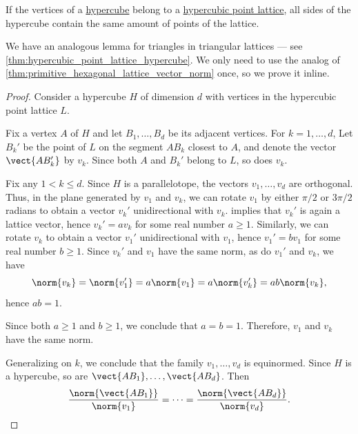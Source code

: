 \begin{lemma}\label{thm:hypercubic_point_lattice_hypercube}
  If the vertices of a \hyperref[def:hypercube]{hypercube} belong to a \hyperref[def:hypercubic_point_lattice]{hypercubic point lattice}, all sides of the hypercube contain the same amount of points of the lattice.
\end{lemma}
\begin{comments}
  \item We have an analogous lemma for triangles in triangular lattices --- see \cref{thm:hypercubic_point_lattice_hypercube}. We only need to use the analog of \cref{thm:primitive_hexagonal_lattice_vector_norm} once, so we prove it inline.
\end{comments}
\begin{proof}
  Consider a hypercube \( H \) of dimension \( d \) with vertices in the hypercubic point lattice \( L \).

  Fix a vertex \( A \) of \( H \) and let \( B_1, \ldots, B_d \) be its adjacent vertices. For \( k = 1, \ldots, d \), Let \( B_k' \) be the point of \( L \) on the segment \( A B_k \) closest to \( A \), and denote the vector \( \vect{A B_k'} \) by \( v_k \). Since both \( A \) and \( B_k' \) belong to \( L \), so does \( v_k \).

  Fix any \( 1 < k \leq d \). Since \( H \) is a parallelotope, the vectors \( v_1, \ldots, v_d \) are orthogonal. Thus, in the plane generated by \( v_1 \) and \( v_k \), we can rotate \( v_1 \) by either \( \pi / 2 \) or \( 3\pi / 2 \) radians to obtain a vector \( v_k' \) unidirectional with \( v_k \).  implies that \( v_k' \) is again a lattice vector, hence \( v_k' = a v_k \) for some real number \( a \geq 1 \). Similarly, we can rotate \( v_k \) to obtain a vector \( v_1' \) unidirectional with \( v_1 \), hence \( v_1' = b v_1 \) for some real number \( b \geq 1 \). Since \( v_k' \) and \( v_1 \) have the same norm, as do \( v_1' \) and \( v_k \), we have
  \begin{equation*}
    \norm{v_k} = \norm{v_1'} = a \norm{v_1} = a \norm{v_k'} = ab \norm{v_k},
  \end{equation*}
  hence \( ab = 1 \).

  Since both \( a \geq 1 \) and \( b \geq 1 \), we conclude that \( a = b = 1 \). Therefore, \( v_1 \) and \( v_k \) have the same norm.

  Generalizing on \( k \), we conclude that the family \( v_1, \ldots, v_d \) is equinormed. Since \( H \) is a hypercube, so are \( \vect{AB_1}, \ldots, \vect{AB_d} \). Then
  \begin{equation*}
    \frac {\norm{\vect{A B_1}}} {\norm{v_1}} = \cdots = \frac {\norm{\vect{A B_d}}} {\norm{v_d}}.
  \end{equation*}


\end{proof}
